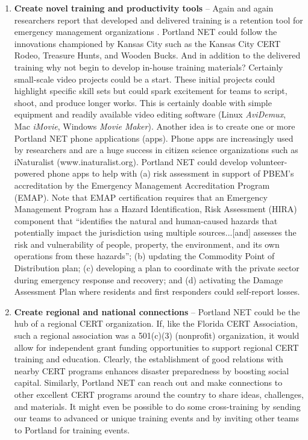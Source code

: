 \documentclass[11pt,fleqn]{book} %
\begin{document}
\begin{enumerate}
  \item \textbf{Create novel training and productivity tools} -- Again and again researchers report that developed and delivered training is a retention tool for emergency management organizations \autocite{ranse_engaging_2010, fahey_training_2002}. Portland NET could follow the innovations championed by Kansas City such as the Kansas City CERT Rodeo, Treasure Hunts, and Wooden Bucks. And in addition to the delivered training why not begin to develop in-house training materials? Certainly small-scale video projects could be a start. These initial projects could highlight specific skill sets but could spark excitement for teams to script, shoot, and produce longer works. This is certainly doable with simple equipment and readily available video editing software (Linux \textit{AviDemux}, Mac \textit{iMovie}, Windows \textit{Movie Maker}). Another idea is to create one or more Portland NET phone applications (apps). Phone apps are increasingly used by researchers and are a huge success in citizen science organizations such as iNaturalist (www.inaturalist.org). Portland NET could develop volunteer-powered phone apps to help with (a) risk assessment in support of PBEM's accreditation by the Emergency Management Accreditation Program (EMAP). Note that EMAP certification requires that an Emergency Management Program has a Hazard Identification, Risk Assessment (HIRA) component that \enquote{identifies the natural and human-caused hazards that potentially impact the jurisdiction using multiple sources...[and] assesses the risk and vulnerability of people, property, the environment, and its own operations from these hazards}; (b) updating the Commodity Point of Distribution plan; (c) developing a plan to coordinate with the private sector during emergency response and recovery; and (d) activating the Damage Assessment Plan where residents and first responders could self-report losses.\\
  \item \textbf{Create regional and national connections} -- Portland NET could be the hub of a regional CERT organization. If, like the Florida CERT Association, such a regional association was a 501(c)(3) (nonprofit) organization, it would allow for independent grant funding opportunities to support regional CERT training and education. Clearly, the establishment of good relations with nearby CERT programs enhances disaster preparedness by boosting social capital. Similarly, Portland NET can reach out and make connections to other excellent CERT programs around the country to share ideas, challenges, and materials. It might even be possible to do some cross-training by sending our teams to advanced or unique training events and by inviting other teams to Portland for training events.\\

\end{enumerate}
\end{document}
